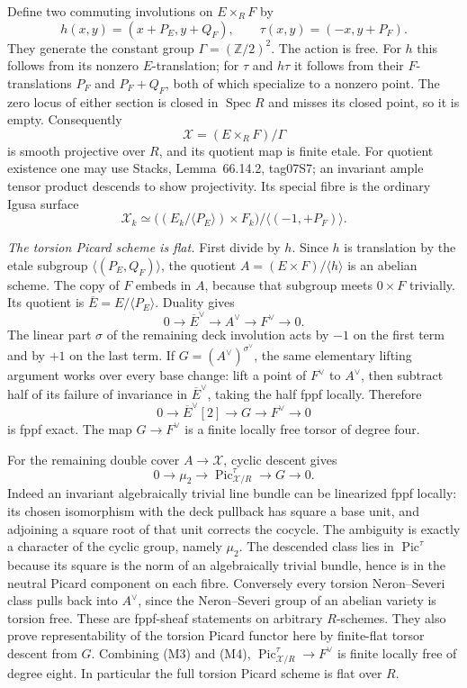 Define two commuting involutions on $E\times_R F$ by
\[
 h(x,y)=(x+P_E,y+Q_F),\qquad
 \tau(x,y)=(-x,y+P_F).
\]
They generate the constant group $\Gamma=(\mathbb Z/2)^2$.
The action is free. For $h$ this follows from its nonzero $E$-translation;
for $\tau$ and $h\tau$ it follows from their $F$-translations
$P_F$ and $P_F+Q_F$, both of which specialize to a nonzero point.
The zero locus of either section is closed in $\operatorname{Spec}R$
and misses its closed point, so it is empty. Consequently
\[
 \mathcal X=(E\times_R F)/\Gamma
\]
is smooth projective over $R$, and its quotient map is finite etale.
For quotient existence one may use Stacks, Lemma~66.14.2, tag07S7;
an invariant ample tensor product descends to show projectivity.
Its special fibre is the ordinary Igusa surface
\[
 \mathcal X_k\simeq
 \bigl((E_k/\langle P_E\rangle)\times F_k\bigr)
 /\langle(-1,+P_F)\rangle.                              \tag{M1}
\]

\emph{The torsion Picard scheme is flat.}
First divide by $h$. Since $h$ is translation by the etale subgroup
$\langle(P_E,Q_F)\rangle$, the quotient
$A=(E\times F)/\langle h\rangle$ is an abelian scheme.
The copy of $F$ embeds in $A$, because that subgroup meets
$0\times F$ trivially. Its quotient is $\overline E=E/\langle P_E\rangle$.
Duality gives
\[
 0\longrightarrow\overline E^{\vee}\longrightarrow A^{\vee}
 \longrightarrow F^{\vee}\longrightarrow0.              \tag{M2}
\]
The linear part $\sigma$ of the remaining deck involution acts by
$-1$ on the first term and by $+1$ on the last term. If
$G=(A^{\vee})^{\sigma^{\vee}}$, the same elementary lifting argument
works over every base change: lift a point of $F^{\vee}$ to $A^{\vee}$,
then subtract half of its failure of invariance in
$\overline E^{\vee}$, taking the half fppf locally. Therefore
\[
 0\longrightarrow\overline E^{\vee}[2]\longrightarrow G
 \longrightarrow F^{\vee}\longrightarrow0               \tag{M3}
\]
is fppf exact. The map $G\to F^{\vee}$ is a finite locally free
torsor of degree four.

For the remaining double cover $A\to\mathcal X$, cyclic descent
gives
\[
 0\longrightarrow\mu_2\longrightarrow
 \operatorname{Pic}^{\tau}_{\mathcal X/R}
 \longrightarrow G\longrightarrow0.                    \tag{M4}
\]
Indeed an invariant algebraically trivial line bundle can be
linearized fppf locally: its chosen isomorphism with the deck
pullback has square a base unit, and adjoining a square root of
that unit corrects the cocycle. The ambiguity is exactly a
character of the cyclic group, namely $\mu_2$. The descended
class lies in $\operatorname{Pic}^{\tau}$ because its square is
the norm of an algebraically trivial bundle, hence is in the
neutral Picard component on each fibre. Conversely every torsion
Neron--Severi class pulls back into $A^{\vee}$, since the
Neron--Severi group of an abelian variety is torsion free.
These are fppf-sheaf statements on arbitrary $R$-schemes.
They also prove representability of the torsion Picard functor
here by finite-flat torsor descent from $G$.
Combining (M3) and (M4),
$\operatorname{Pic}^{\tau}_{\mathcal X/R}\to F^{\vee}$
is finite locally free of degree eight. In particular the full
torsion Picard scheme is flat over $R$.

